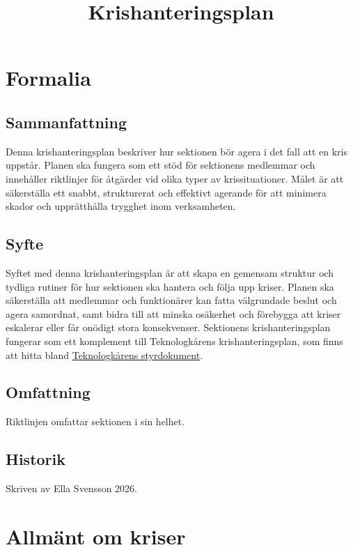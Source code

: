 \documentclass[pdfbookmarks,a4paper,11pt]{article}
\title{Krishanteringsplan}
\begin{document}
\maketitle

\tableofcontents

\newpage

\section{Formalia}

\subsection{Sammanfattning}

Denna krishanteringsplan beskriver hur sektionen bör agera i det fall att en kris uppstår. Planen ska fungera som ett stöd för sektionens medlemmar och innehåller riktlinjer för åtgärder vid olika typer av krissituationer. Målet är att säkerställa ett snabbt, strukturerat och effektivt agerande för att minimera skador och upprätthålla trygghet inom verksamheten. 

\subsection{Syfte}

Syftet med denna krishanteringsplan är att skapa en gemensam struktur och tydliga rutiner för hur sektionen ska hantera och följa upp kriser. Planen ska säkerställa att medlemmar och funktionärer kan fatta välgrundade beslut och agera samordnat, samt bidra till att minska osäkerhet och förebygga att kriser eskalerar eller får onödigt stora konsekvenser. Sektionens krishanteringsplan fungerar som ett komplement till Teknologkårens krishanteringsplan, som finns att hitta bland \href{https://www.tlth.se/styrdokument}{Teknologkårens styrdokument}.

\subsection{Omfattning}

Riktlinjen omfattar sektionen i sin helhet. 

\subsection{Historik}

Skriven av Ella Svensson 2026. 

\section{Allmänt om kriser}
\end{document}
